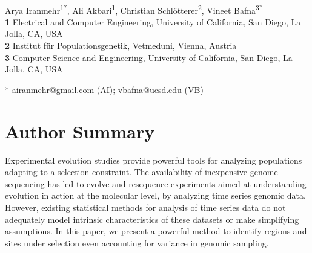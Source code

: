 \documentclass[10pt,letterpaper]{article}
\date{}
\begin{document}
\vspace*{0.2in}

\begin{flushleft}
{\Large
\textbf{}
}
\newline
\\
Arya Iranmehr\textsuperscript{1*},
Ali Akbari\textsuperscript{1},
Christian Schl\"{o}tterer\textsuperscript{2},
Vineet Bafna\textsuperscript{3*}
\\
\bigskip
\textbf{1} Electrical and Computer Engineering, University of California, San 
Diego, La Jolla, CA, USA
\\
\textbf{2} Institut f\"{u}r Populationsgenetik, Vetmeduni, Vienna, Austria
\\
\textbf{3} Computer Science and Engineering, University of California, San 
Diego, La Jolla, CA, USA
\\
\bigskip


* airanmehr@gmail.com (AI); vbafna@ucsd.edu (VB)

\end{flushleft}



\section*{Author Summary}

Experimental evolution studies provide powerful tools for analyzing 
populations adapting to a selection constraint. The availability of 
inexpensive genome sequencing  has led to evolve-and-resequence 
experiments aimed at understanding evolution in action at the molecular 
level, by analyzing time series genomic data. However, existing statistical 
methods for analysis of time series data do not adequately model intrinsic 
characteristics of these datasets or make simplifying assumptions. In this 
paper, we present a powerful method to identify regions and sites under 
selection even accounting for variance in genomic sampling. 


\linenumbers








\newpage




\nolinenumbers
\end{document}
